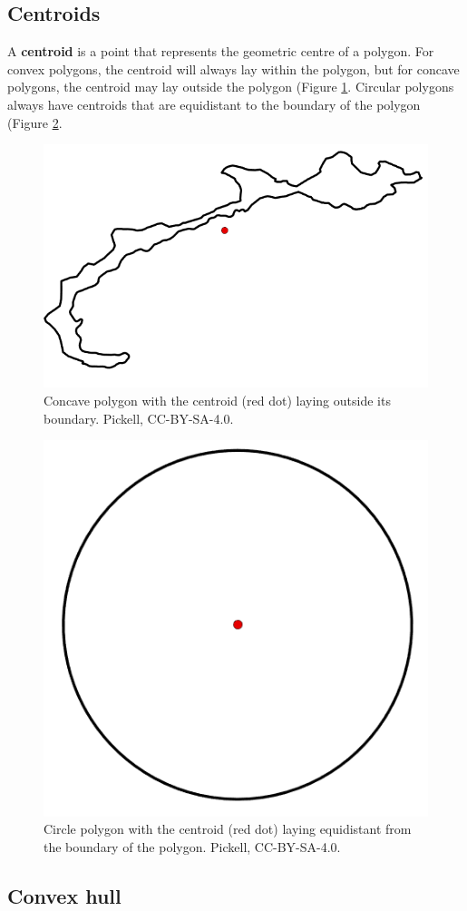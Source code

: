 \documentclass[
]{book}
\begin{document}
\hypertarget{centroids}{%
\subsection{Centroids}\label{centroids}}

A \textbf{centroid} is a point that represents the geometric centre of a polygon. For convex polygons, the centroid will always lay within the polygon, but for concave polygons, the centroid may lay outside the polygon (Figure \ref{fig:7-concave-polygon-centroid}. Circular polygons always have centroids that are equidistant to the boundary of the polygon (Figure \ref{fig:7-circle-polygon-centroid}.

\begin{figure}
\includegraphics[width=0.5\linewidth]{images/07-concave-polygon-centroid} \caption{Concave polygon with the centroid (red dot) laying outside its boundary. Pickell, CC-BY-SA-4.0.}\label{fig:7-concave-polygon-centroid}
\end{figure}

\begin{figure}
\includegraphics[width=0.5\linewidth]{images/07-circle-polygon-centroid} \caption{Circle polygon with the centroid (red dot) laying equidistant from the boundary of the polygon. Pickell, CC-BY-SA-4.0.}\label{fig:7-circle-polygon-centroid}
\end{figure}

\hypertarget{convex-hull}{%
\subsection{Convex hull}\label{convex-hull}}
\end{document}
